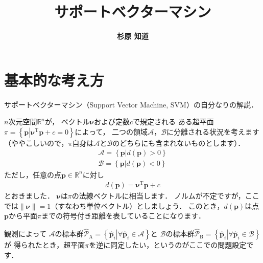 ﻿\documentclass[a4paper]{jsarticle}
\title{\bf サポートベクターマシン}
\author{\Large{\bf 杉原 知道}}
\date{}
\begin{document}
\maketitle
\vspace{-\baselineskip}

\section{基本的な考え方}

サポートベクターマシン（Support Vector Machine, SVM）の自分なりの解説．

$n$次元空間$\mathbb{R}^{n}$が，
ベクトル$\bm{\nu}$および定数$c$で規定される
ある超平面$\pi=\left\{\bm{p}\left|\bm{\nu}^{\mathrm{T}}\bm{p}+c=0\right.\right\}$によって，
二つの領域$\mathcal{A}$，$\mathcal{B}$に分離される状況を考えます
（ややこしいので，$\pi$自身は$\mathcal{A}$と$\mathcal{B}$のどちらにも含まれないものとします）．
\begin{align*}
\mathcal{A}=\left\{\bm{p}\left|d(\bm{p})>0\right.\right\}
\\
\mathcal{B}=\left\{\bm{p}\left|d(\bm{p})<0\right.\right\}
\end{align*}
ただし，任意の点$\bm{p}\in\mathbb{R}^{n}$に対し
\begin{align*}
d(\bm{p})=\bm{\nu}^{\mathrm{T}}\bm{p}+c
\end{align*}
とおきました．
$\bm{\nu}$は$\pi$の法線ベクトルに相当します．
ノルムが不定ですが，ここでは$\|\bm{\nu}\|=1$（すなわち単位ベクトル）としましょう．
このとき，$d(\bm{p})$は点$\bm{p}$から平面$\pi$までの符号付き距離を表していることになります．

観測によって
$\mathcal{A}$の標本群$\hat{\mathcal{P}}_{\mathrm{A}}=\left\{\hat{\bm{p}}_{i}\left|\forall\hat{\bm{p}}_{i}\in\mathcal{A}\right.\right\}$と
$\mathcal{B}$の標本群$\hat{\mathcal{P}}_{\mathrm{B}}=\left\{\hat{\bm{p}}_{i}\left|\forall\hat{\bm{p}}_{i}\in\mathcal{B}\right.\right\}$が
得られたとき，超平面$\pi$を逆に同定したい，というのがここでの問題設定です．
\end{document}
